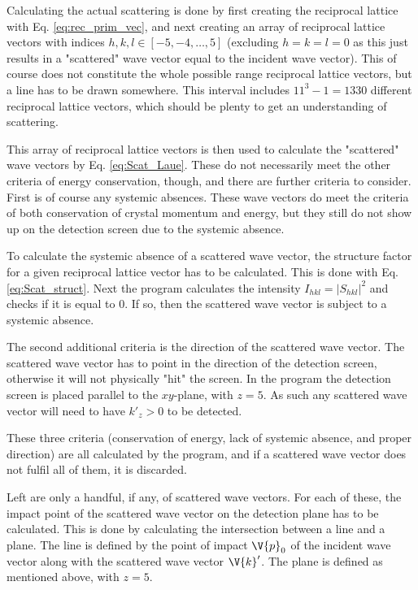 \documentclass[main.tex]{subfiles}
\begin{document}
	Calculating the actual scattering is done by first creating the reciprocal lattice with Eq. \eqref{eq:rec_prim_vec}, and next creating an array of reciprocal lattice vectors with indices $ h,k,l \in [-5, -4, \dots, 5] $ (excluding $ h=k=l=0 $ as this just results in a "scattered" wave vector equal to the incident wave vector). This of course does not constitute the whole possible range reciprocal lattice vectors, but a line has to be drawn somewhere. This interval includes $ 11^3 - 1 = 1330$ different reciprocal lattice vectors, which should be plenty to get an understanding of scattering.
	
	This array of reciprocal lattice vectors is then used to calculate the "scattered" wave vectors by Eq. \eqref{eq:Scat_Laue}. These do not necessarily meet the other criteria of energy conservation, though, and there are further criteria to consider. First is of course any systemic absences. These wave vectors do meet the criteria of both conservation of crystal momentum and energy, but they still do not show up on the detection screen due to the systemic absence.
	
	To calculate the systemic absence of a scattered wave vector, the structure factor for a given reciprocal lattice vector has to be calculated. This is done with Eq. \eqref{eq:Scat_struct}. Next the program calculates the intensity $ I_{hkl}=|S_{hkl}|^2 $ and checks if it is equal to 0. If so, then the scattered wave vector is subject to a systemic absence.
	
	The second additional criteria is the direction of the scattered wave vector. The scattered wave vector has to point in the direction of the detection screen, otherwise it will not physically "hit" the screen. In the program the detection screen is placed parallel to the $ xy $-plane, with $ z=5 $. As such any scattered wave vector will need to have $ k'_z > 0 $ to be detected.
	
	These three criteria (conservation of energy, lack of systemic absence, and proper direction) are all calculated by the program, and if a scattered wave vector does not fulfil all of them, it is discarded.
	
	Left are only a handful, if any, of scattered wave vectors. For each of these, the impact point of the scattered wave vector on the detection plane has to be calculated. This is done by calculating the intersection between a line and a plane. The line is defined by the point of impact $ \V{p}_0 $ of the incident wave vector along with the scattered wave vector $ \V{k}' $. The plane is defined as mentioned above, with $ z=5 $.
	
\end{document}

